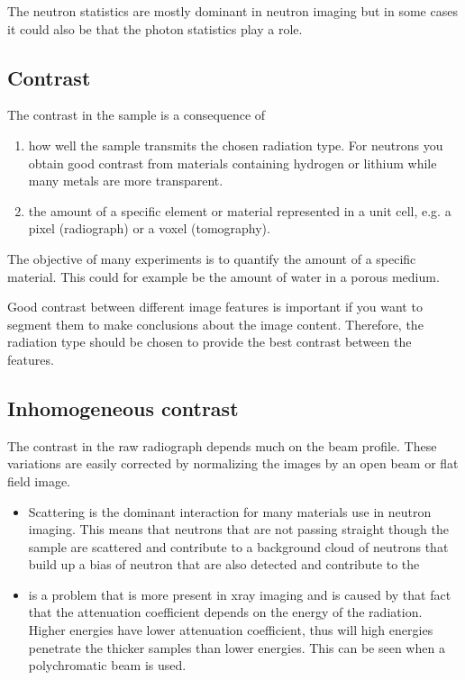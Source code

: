 \documentclass[letterpaper,10pt,english]{sphinxmanual}
\begin{document}
\sphinxAtStartPar
The neutron statistics are mostly dominant in neutron imaging but in some cases it could also be that the photon statistics play a role.


\subsection{Contrast}
\label{\detokenize{02-ImageEnhancement:contrast}}
\sphinxAtStartPar
The contrast in the sample is a consequence of
\begin{enumerate}
%
\item {} 
\sphinxAtStartPar
how well the sample transmits the chosen radiation type. For neutrons you obtain good contrast from materials containing hydrogen or lithium while many metals are more transparent.

\item {} 
\sphinxAtStartPar
the amount of a specific element or material represented in a unit cell, e.g. a pixel (radiograph) or a voxel (tomography).

\end{enumerate}

\sphinxAtStartPar
The objective of many experiments is to quantify the amount of a specific material. This could for example be the amount of water in a porous medium.

\sphinxAtStartPar
Good contrast between different image features is important if you want to segment them to make conclusions about the image content. Therefore, the radiation type should be chosen to provide the best contrast between the features.


\subsection{Inhomogeneous contrast}
\label{\detokenize{02-ImageEnhancement:inhomogeneous-contrast}}
\sphinxAtStartPar
The contrast in the raw radiograph depends much on the beam profile. These variations are easily corrected by normalizing the images by an open beam or flat field image.
\begin{itemize}
\item {} 
\sphinxAtStartPar
{} Scattering is the dominant interaction for many materials use in neutron imaging. This means that neutrons that are not passing straight though the sample are scattered and contribute to a background cloud of neutrons that build up a bias of neutron that are also detected and contribute to the

\item {} 
\sphinxAtStartPar
{} is a problem that is more present in x\sphinxhyphen{}ray imaging and is caused by that fact that the attenuation coefficient depends on the energy of the radiation. Higher energies have lower attenuation coefficient, thus will high energies penetrate the thicker samples than lower energies. This can be seen when a polychromatic beam is used.

\end{itemize}
\end{document}
